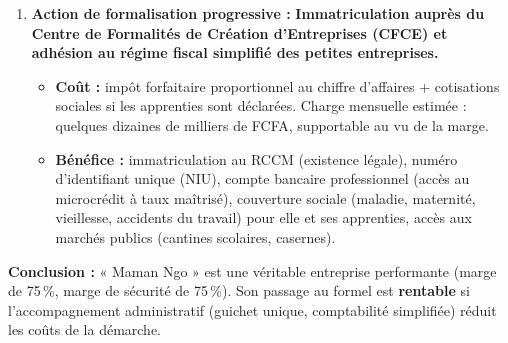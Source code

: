 \documentclass[11pt]{article}
\newcommand{\cle}[1]{{\popxbold\color{popdark}#1}}
\begin{document}
\begin{exoresolu}
\begin{enumerate}
\begin{itemize}
              \end{itemize}
        \item \textbf{Action de formalisation progressive :}
              \textbf{Immatriculation auprès du Centre de Formalités de Création d'Entreprises (CFCE) et adhésion au régime fiscal simplifié des petites entreprises.}
              \begin{itemize}
                  \item \textbf{Coût :} impôt forfaitaire proportionnel au chiffre d'affaires + cotisations sociales si les apprenties sont déclarées. Charge mensuelle estimée : quelques dizaines de milliers de FCFA, supportable au vu de la marge.
                  \item \textbf{Bénéfice :} immatriculation au RCCM (existence légale), numéro d'identifiant unique (NIU), compte bancaire professionnel (accès au microcrédit à taux maîtrisé), couverture sociale (maladie, maternité, vieillesse, accidents du travail) pour elle et ses apprenties, accès aux marchés publics (cantines scolaires, casernes).
              \end{itemize}
    \end{enumerate}
    \textbf{Conclusion :} « Maman Ngo » est une \cle{véritable entreprise} performante (marge de 75\,\%, marge de sécurité de 75\,\%). Son passage au formel est \textbf{rentable} si l'accompagnement administratif (guichet unique, comptabilité simplifiée) réduit les coûts de la démarche.
\end{exoresolu}
\end{document}
